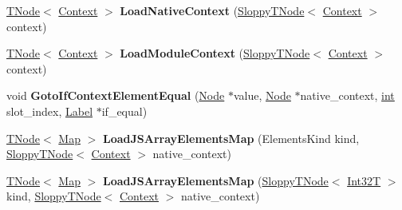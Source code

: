 \begin{DoxyCompactItemize}
\item 
\mbox{\label{classv8_1_1internal_1_1CodeStubAssembler_acbae9ca69de93c748c09afc2cbe0d2f7}} 
\mbox{\hyperlink{classv8_1_1internal_1_1compiler_1_1TNode}{T\+Node}}$<$ \mbox{\hyperlink{classv8_1_1internal_1_1Context}{Context}} $>$ {\bfseries Load\+Native\+Context} (\mbox{\hyperlink{classv8_1_1internal_1_1compiler_1_1SloppyTNode}{Sloppy\+T\+Node}}$<$ \mbox{\hyperlink{classv8_1_1internal_1_1Context}{Context}} $>$ context)
\item 
\mbox{\label{classv8_1_1internal_1_1CodeStubAssembler_a1204d65b6b425eecd21654fafe042e3a}} 
\mbox{\hyperlink{classv8_1_1internal_1_1compiler_1_1TNode}{T\+Node}}$<$ \mbox{\hyperlink{classv8_1_1internal_1_1Context}{Context}} $>$ {\bfseries Load\+Module\+Context} (\mbox{\hyperlink{classv8_1_1internal_1_1compiler_1_1SloppyTNode}{Sloppy\+T\+Node}}$<$ \mbox{\hyperlink{classv8_1_1internal_1_1Context}{Context}} $>$ context)
\item 
\mbox{\label{classv8_1_1internal_1_1CodeStubAssembler_ae17ad81fbd133550e16d556824a0a5a3}} 
void {\bfseries Goto\+If\+Context\+Element\+Equal} (\mbox{\hyperlink{classv8_1_1internal_1_1compiler_1_1Node}{Node}} $\ast$value, \mbox{\hyperlink{classv8_1_1internal_1_1compiler_1_1Node}{Node}} $\ast$native\+\_\+context, \mbox{\hyperlink{classint}{int}} slot\+\_\+index, \mbox{\hyperlink{classv8_1_1internal_1_1compiler_1_1CodeAssemblerLabel}{Label}} $\ast$if\+\_\+equal)
\item 
\mbox{\label{classv8_1_1internal_1_1CodeStubAssembler_ab1814de2ce284647fa91d46877c648a0}} 
\mbox{\hyperlink{classv8_1_1internal_1_1compiler_1_1TNode}{T\+Node}}$<$ \mbox{\hyperlink{classv8_1_1internal_1_1Map}{Map}} $>$ {\bfseries Load\+J\+S\+Array\+Elements\+Map} (Elements\+Kind kind, \mbox{\hyperlink{classv8_1_1internal_1_1compiler_1_1SloppyTNode}{Sloppy\+T\+Node}}$<$ \mbox{\hyperlink{classv8_1_1internal_1_1Context}{Context}} $>$ native\+\_\+context)
\item 
\mbox{\label{classv8_1_1internal_1_1CodeStubAssembler_ac8132dadece649a0560bc5b444b5e9d5}} 
\mbox{\hyperlink{classv8_1_1internal_1_1compiler_1_1TNode}{T\+Node}}$<$ \mbox{\hyperlink{classv8_1_1internal_1_1Map}{Map}} $>$ {\bfseries Load\+J\+S\+Array\+Elements\+Map} (\mbox{\hyperlink{classv8_1_1internal_1_1compiler_1_1SloppyTNode}{Sloppy\+T\+Node}}$<$ \mbox{\hyperlink{structv8_1_1internal_1_1Int32T}{Int32T}} $>$ kind, \mbox{\hyperlink{classv8_1_1internal_1_1compiler_1_1SloppyTNode}{Sloppy\+T\+Node}}$<$ \mbox{\hyperlink{classv8_1_1internal_1_1Context}{Context}} $>$ native\+\_\+context)

\end{DoxyCompactItemize}
